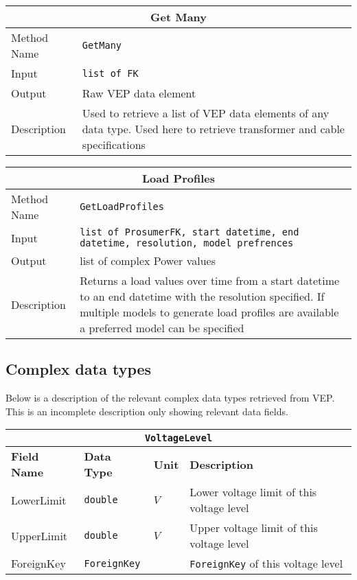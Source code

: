 \vspace{.5cm}

\begin{tabular}{ l  p{12cm}} 
    \hline
    \multicolumn{2}{c}{\textbf{Get Many}}\\
    \hline
    Method Name     & \texttt{GetMany} \\
    Input           & \texttt{list of FK}\\
    Output          & Raw VEP data element \\
    Description     & Used to retrieve a list of VEP data elements of any data type. Used here to retrieve transformer and cable specifications\\
\end{tabular}

\vspace{.5cm}

\begin{tabular}{ l  p{12cm}} 
    \hline
    \multicolumn{2}{c}{\textbf{Load Profiles}}\\
    \hline
    Method Name     & \texttt{GetLoadProfiles} \\
    Input           & \texttt{list of ProsumerFK, start datetime, end datetime, resolution, model prefrences}\\
    Output          & list of complex Power values \\
    Description     & Returns a load values over time from a start datetime to an end datetime with the resolution specified. If multiple models to generate load profiles are available a preferred model can be specified \\
\end{tabular}

\subsection{Complex data types}

Below is a description of the relevant complex data types retrieved from VEP. This is an incomplete
description only showing relevant data fields.

\vspace{.5cm}

\begin{tabular}{ l p{3cm} l p{8cm}} 
    \hline
    \multicolumn{4}{c}{\texttt{VoltageLevel}}\\
    \hline
    \textbf{Field Name} & \textbf{Data Type}       & \textbf{Unit} & \textbf{Description} \\
    \hline
    LowerLimit          & \texttt{double}          & $V$           & Lower voltage limit of this voltage level\\
    UpperLimit          & \texttt{double}          & $V$           & Upper voltage limit of this voltage level\\
    ForeignKey          & \texttt{ForeignKey}      &               & \texttt{ForeignKey} of this voltage level
\end{tabular}

